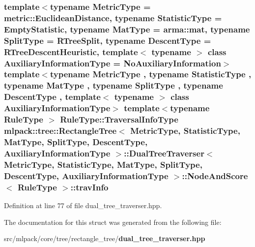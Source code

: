 \subsubsection[{trav\+Info}]{\setlength{\rightskip}{0pt plus 5cm}template$<$typename Metric\+Type  = metric\+::\+Euclidean\+Distance, typename Statistic\+Type  = Empty\+Statistic, typename Mat\+Type  = arma\+::mat, typename Split\+Type  = R\+Tree\+Split, typename Descent\+Type  = R\+Tree\+Descent\+Heuristic, template$<$ typename $>$ class Auxiliary\+Information\+Type = No\+Auxiliary\+Information$>$ template$<$typename Metric\+Type , typename Statistic\+Type , typename Mat\+Type , typename Split\+Type , typename Descent\+Type , template$<$ typename $>$ class Auxiliary\+Information\+Type$>$ template$<$typename Rule\+Type $>$ Rule\+Type\+::\+Traversal\+Info\+Type {\bf mlpack\+::tree\+::\+Rectangle\+Tree}$<$ Metric\+Type, Statistic\+Type, Mat\+Type, {\bf Split\+Type}, {\bf Descent\+Type}, Auxiliary\+Information\+Type $>$\+::{\bf Dual\+Tree\+Traverser}$<$ Metric\+Type, Statistic\+Type, Mat\+Type, {\bf Split\+Type}, {\bf Descent\+Type}, Auxiliary\+Information\+Type $>$\+::{\bf Node\+And\+Score}$<$ Rule\+Type $>$\+::trav\+Info}\label{structmlpack_1_1tree_1_1RectangleTree_1_1DualTreeTraverser_1_1NodeAndScore_a5e0cbe275fdcb4c6ce0ebd080c329e47}


Definition at line 77 of file dual\+\_\+tree\+\_\+traverser.\+hpp.



The documentation for this struct was generated from the following file\+:\begin{DoxyCompactItemize}
\item 
src/mlpack/core/tree/rectangle\+\_\+tree/{\bf dual\+\_\+tree\+\_\+traverser.\+hpp}\end{DoxyCompactItemize}
